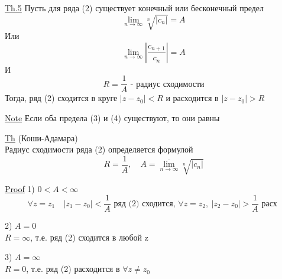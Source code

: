 \documentclass[a4paper]{article}
\begin{document}
\begin{tcolorbox}
\underline{Th.5} Пусть для ряда (2) существует конечный или бесконечный предел
\begin{equation}
    \lim_{n \to \infty} \sqrt[n]{|c_n|} = A
\end{equation}
Или
\begin{equation}
    \lim_{n \to \infty} \left| \frac{c_{n+1}}{c_n} \right| = A
\end{equation}
И
\[
    R = \frac{1}{A} \text{ - радиус сходимости}
\]
Тогда, ряд (2) сходится в круге $ |z - z_0| < R $ и расходится в $ |z- z_0| > R $ 
\end{tcolorbox}

\begin{tcolorbox}
\underline{Note} Если оба предела (3) и (4) существуют, то они равны
\end{tcolorbox}

\begin{tcolorbox}
\underline{Th} (Коши-Адамара)\\
Радиус сходимости ряда (2) определяется формулой
\begin{equation}
    R = \frac{1}{A}, \quad A = \overline{\lim_{n \to \infty} } \sqrt[n]{|c_n|} 
\end{equation}

\underline{Proof} 1) $ 0 < A < \infty $ 
\[
    \forall z = z_1 \quad |z_1 - z_0 | < \frac{1}{A} \text{ ряд (2) сходится, }
    \forall z = z_2, \ |z_2 - z_0| > \frac{1}{A} \text{ расх } 
\]

2) $ A = 0 $\\
$ R = \infty $, т.е. ряд (2) сходится в любой z

3) $ A = \infty $ \\
$ R = 0 $, т.е. ряд (2) расходится в $ \forall z \neq z_0 $ 
\end{tcolorbox}
\end{document}
